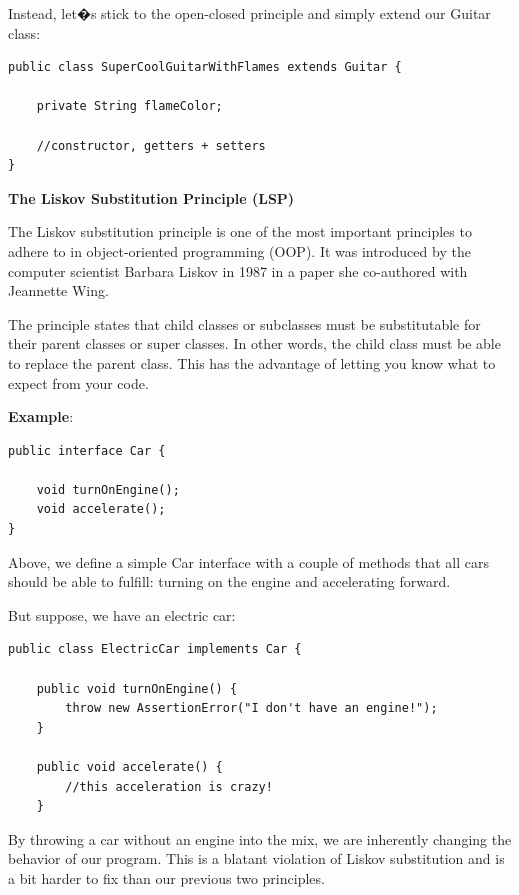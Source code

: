 Instead, let�s stick to the open-closed principle and simply extend our Guitar class:

\begin{lstlisting}
public class SuperCoolGuitarWithFlames extends Guitar {

    private String flameColor;

    //constructor, getters + setters
}
\end{lstlisting}

\medskip
\begin{center}
\textbf{The Liskov Substitution Principle (LSP)}
\end{center}

The Liskov substitution principle is one of the most important principles to adhere to in object-oriented programming (OOP). It was introduced by the computer scientist Barbara Liskov in 1987 in a paper she co-authored with Jeannette Wing.

The principle states that child classes or subclasses must be substitutable for their parent classes or super classes. In other words, the child class must be able to replace the parent class. This has the advantage of letting you know what to expect from your code.

\textbf{Example}:

\begin{lstlisting}
public interface Car {

    void turnOnEngine();
    void accelerate();
}
\end{lstlisting}

Above, we define a simple Car interface with a couple of methods that all cars should be able to fulfill: turning on the engine and accelerating forward.

But suppose, we have an electric car:

\begin{lstlisting}
public class ElectricCar implements Car {

    public void turnOnEngine() {
        throw new AssertionError("I don't have an engine!");
    }

    public void accelerate() {
        //this acceleration is crazy!
    }
\end{lstlisting}

By throwing a car without an engine into the mix, we are inherently changing the behavior of our program. This is a blatant violation of Liskov substitution and is a bit harder to fix than our previous two principles.

